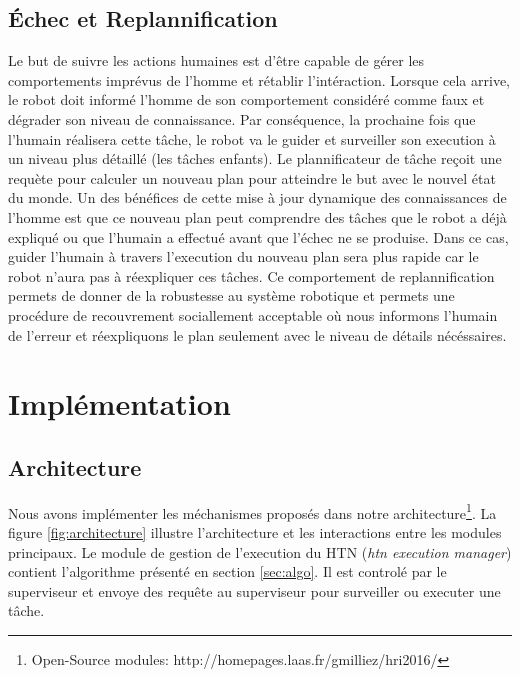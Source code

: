 \documentclass[a4paper,11pt,twoside]{StyleThese}
\begin{document}
\subsection{Échec et Replannification}

Le but de suivre les actions humaines est d'être capable de gérer les comportements imprévus de l'homme et rétablir l'intéraction. Lorsque cela arrive, le robot doit informé l'homme de son comportement considéré comme faux et dégrader son niveau de connaissance. Par conséquence, la prochaine fois que l'humain réalisera cette tâche, le robot va le guider et surveiller son execution à un niveau plus détaillé (les tâches enfants).
Le plannificateur de tâche reçoit une requète pour calculer un nouveau plan pour atteindre le but avec le nouvel état du monde. 
Un des bénéfices de cette mise à jour dynamique des connaissances de l'homme est que ce nouveau plan peut comprendre des tâches que le robot a déjà expliqué ou que l'humain a effectué avant que l'échec ne se produise. Dans ce cas, guider l'humain à travers l'execution du nouveau plan sera plus rapide car le robot n'aura pas à réexpliquer ces tâches.
Ce comportement de replannification permets de donner de la robustesse au système robotique et permets une procédure de recouvrement sociallement acceptable où nous informons l'humain de l'erreur et réexpliquons le plan seulement avec le niveau de détails nécéssaires.





\section{Implémentation}
\subsection{Architecture}
Nous avons implémenter les méchanismes proposés dans notre architecture\footnote{Open-Source modules: http://homepages.laas.fr/gmilliez/hri2016/}. La figure \ref{fig:architecture} illustre l'architecture et les interactions entre les modules principaux.
Le module de gestion de l'execution du HTN (\textit{htn execution manager}) contient l'algorithme présenté en section \ref{sec:algo}.
Il est controlé par le superviseur et envoye des requête au superviseur pour surveiller ou executer une tâche.
\end{document}
